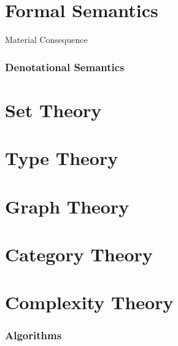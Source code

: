 \documentclass{article}
\begin{document}
\part{Formal Semantics}

Material Consequence

\section{Denotational Semantics}

\part{Set Theory}

\part{Type Theory}

\part{Graph Theory}

\part{Category Theory}

\part{Complexity Theory}

\section{Algorithms}
\end{document}
